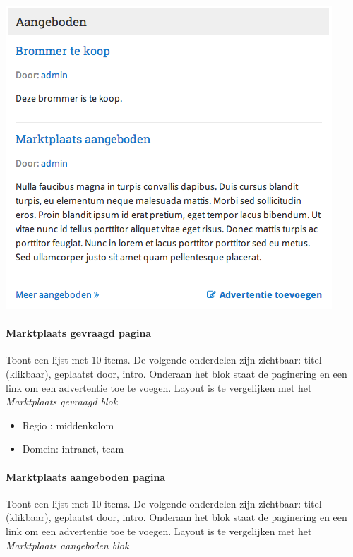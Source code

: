 \begin{center}
	\includegraphics[scale=0.5]{img/blokken/marktplaatsaangeboden.png}
\end{center}

\paragraph{Marktplaats gevraagd pagina}

Toont een lijst met 10 items. De volgende onderdelen zijn zichtbaar: titel (klikbaar), geplaatst door, intro. Onderaan het blok staat de paginering en een link om een advertentie toe te voegen. Layout is te vergelijken met het \emph{Marktplaats gevraagd blok}

\begin{itemize}
\item Regio : middenkolom
\item Domein: intranet, team
\end{itemize}

\paragraph{Marktplaats aangeboden pagina}

Toont een lijst met 10 items. De volgende onderdelen zijn zichtbaar: titel (klikbaar), geplaatst door, intro. Onderaan het blok staat de paginering en een link om een advertentie toe te voegen. Layout is te vergelijken met het \emph{Marktplaats aangeboden blok}

